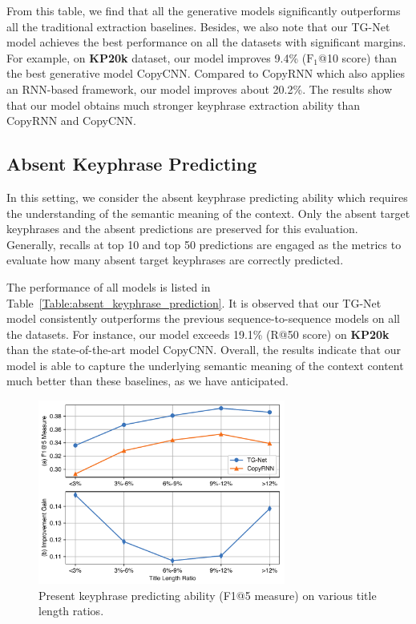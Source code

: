 \documentclass[letterpaper]{article} %
\begin{document}
From this table, we find that all the generative models significantly outperforms all the traditional extraction baselines. Besides, we also note that our TG-Net model achieves the best performance on all the datasets with significant margins. For example, on \textbf{KP20k} dataset, our model improves 9.4\% ($\text{F}_1$@10 score) than the best generative model CopyCNN. Compared to CopyRNN which also applies an RNN-based framework, our model improves about 20.2\%. The results show that our model obtains much stronger keyphrase extraction ability than CopyRNN and CopyCNN.

\subsection{Absent Keyphrase Predicting}
In this setting, we consider the absent keyphrase predicting ability which requires the understanding of the semantic meaning of the context. Only the absent target keyphrases and the absent predictions are preserved for this evaluation. Generally, recalls at top 10 and top 50 predictions are engaged as the metrics to evaluate how many absent target keyphrases are correctly predicted. 

The performance of all models is listed in Table~\ref{Table:absent_keyphrase_prediction}. It is observed that our TG-Net model consistently outperforms the previous sequence-to-sequence models on all the datasets. For instance, our model exceeds 19.1\% (R@50 score) on \textbf{KP20k} than the state-of-the-art model CopyCNN. Overall, the results indicate that our model is able to capture the underlying semantic meaning of the context content much better than these baselines, as we have anticipated.

\begin{figure}[t]
\centering
\includegraphics[width=3.2in]{figures/PaperID3210_TGNet_title_len_ratios_cmyk.pdf}
\caption{Present keyphrase predicting ability (F1@5 measure) on various title length ratios.}
\label{figure:title_lens_present_cureve}
\end{figure}
\end{document}
